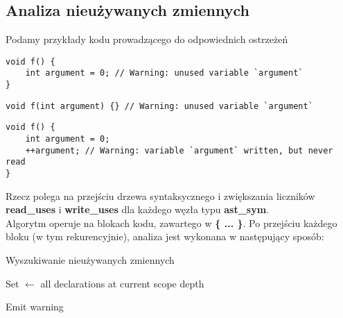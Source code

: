\documentclass[a4paper, 12pt]{extarticle}
\newcommand{\spacing}{\vskip 0.5cm}
\begin{document}
		\subsection{Analiza nieużywanych zmiennych}
			
			Podamy przykłady kodu prowadzącego do odpowiednich ostrzeżeń
			
			\spacing

			\begin{lstlisting}[caption={Nieużywana zmienna}, label={lst:warn-unused-var}]
void f() {
	int argument = 0; // Warning: unused variable `argument`
}
			\end{lstlisting}

			\begin{lstlisting}[caption={Nieużywany parametr}, label={lst:warn-unused-var}]
void f(int argument) {} // Warning: unused variable `argument`
			\end{lstlisting}
			
			\begin{lstlisting}[caption={Nieodczytana zmienna}, label={lst:warn-unused-var}]
void f() {
	int argument = 0;
	++argument; // Warning: variable `argument` written, but never read
}
			\end{lstlisting}

			
			\spacing
			
			Rzecz polega na przejściu drzewa syntaksycznego i zwiększania liczników
			\textbf{read_uses} i \textbf{write_uses} dla każdego węzła typu
			\textbf{ast_sym}.
			\\
			
			Algorytm operuje na blokach kodu, zawartego w \textbf{\{ ... \}}. Po przejściu każdego bloku
			(w tym rekurencyjnie), analiza jest wykonana w następujący sposób:

			\begin{algorithm}
				\caption{Wyszukiwanie nieużywanych zmiennych}
				\begin{algorithmic}[1]

					\State Set $\gets$ all declarations at current scope depth

							\State Emit warning
						\EndIf
					\EndFor
				\EndProcedure

				\end{algorithmic}
			\end{algorithm}
			
\end{document}
